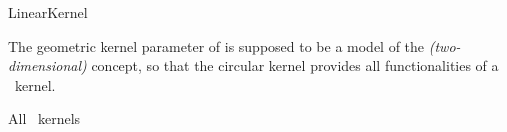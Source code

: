 \begin{ccRefConcept}{LinearKernel} 

\ccDefinition

The geometric kernel parameter of  is
supposed to be a model of the \textit{(two-dimensional)} 
concept, so that the circular kernel provides all functionalities of a
\cgal\ kernel.





\ccHasModels

All \cgal\ kernels

\ccSeeAlso

\\

\end{ccRefConcept}
